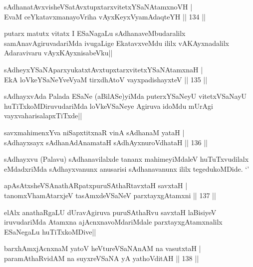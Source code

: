 \begin{shl}
sAdhanatAvxvisheVSatAvxtupxtarxvitetxYSaNAtamxnoVH |\\
EvaM ceYkatavxmanayoVriha vAyxKeyxVyamAdaqteYH \hfill || 134 ||
\end{shl}

\begin{artha}
putarx matutx vitatx I ESaNagaLu sAdhanaveMbudaralilx samAnavAgiruvadariMda ivugaLige EkatavxveMdu ililx vAKAyxnadalilx Adaravivaru vAyxKAyxnisabeVku||
\end{artha}

\begin{shl}
sAdheyxYSaNAparxyukatxtAvxtupxtarxvitetxYSaNAtamxnaH |\\
EkA loVkeYSaNeYveVyaM tirxdhA\s toV vayxpadishayxteV \hfill || 135 ||
\end{shl}

\begin{artha}
sAdhayxvAda Palada ESaNe (aBilASe)yiMda puterxYSaNeyU vitetxVSaNayU huTiTxkoMDiruvudariMda loVkeVSaNeye Agiruva idoMdu mUrAgi vayxvaharisalapxTiTxde||
\end{artha}


\begin{shl}
savxmahimenxYva niSapxtitxnaR vinA sAdhanaM yataH |\\
sAdhayxsayx sAdhanAdAnamataH sAdhAyxnuroVdhataH \hfill || 136 ||
\end{shl}

\begin{artha}
sAdhayxvu (Palavu) sAdhanavilalxde tananx mahimeyiMdaleV huTuTxvudilalx eMdadxriMda sAdhayxvanunx anusarisi sAdhanavanunx ililx tegedukoMDide. `\stext '
\end{artha}%

\begin{shl}
apAsAtxsheVSAnathARpatxpuruSAthaRtavxtaH savxtaH |\\
tanomxVhamAtarxjeV tasAmxdeVSaNeV parxtayxgAtamxni \hfill || 137 ||
\end{shl}

\begin{artha}
elAlx anathaRgaLU dUravAgiruva puruSAthaRvu savxtaH laBisiyeV iruvudariMda Atamxna ajAcnxnavoMdariMdale parxtayxgAtamxnalilx ESaNegaLu huTiTxkoMDive||
\end{artha}

\begin{shl}
barxhAmxjAcnxnaM yatoV heVtureVSaNAnAM na vasutxtaH |\\
paramAthaRvidAM na suyxreVSaNA yA yathoVditAH \hfill || 138 ||
\end{shl}

